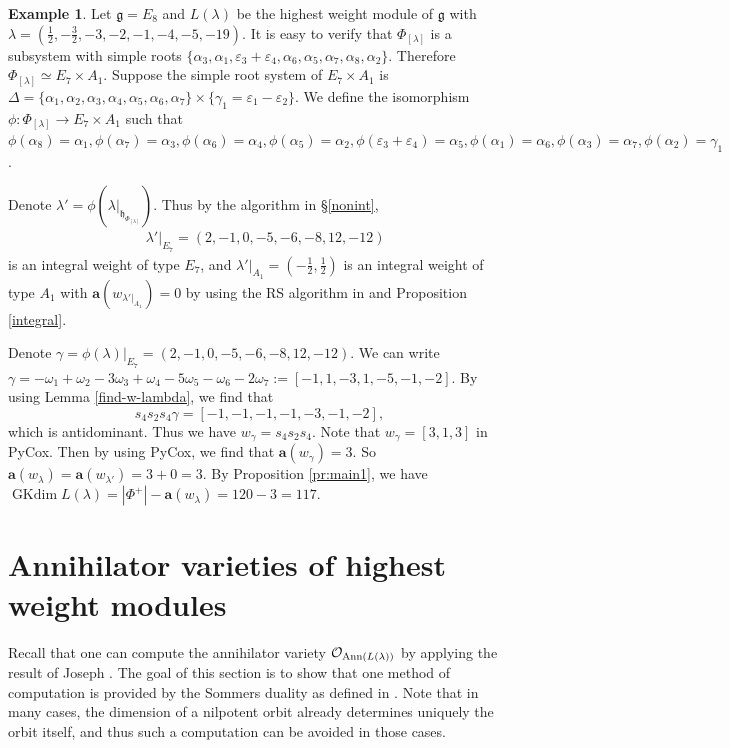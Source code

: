 \documentclass[reqno,12pt]{amsart}
\numberwithin{equation}{section}
\theoremstyle{plain}
\theoremstyle{definition}
\newtheorem{ex}[Thm]{Example}
\newcommand{\lam}{\lambda}
\newcommand{\ep}{\varepsilon}
\newcommand{\aff}{ \mathbf{a} }
\newcommand{\gkd}{\operatorname{GKdim}}
\begin{document}
\begin{ex}
	Let $\mathfrak{g}=E_8$ and $L(\lam)$ be the highest weight module of $\mathfrak{g}$ with  $\lambda=(\frac{1}{2},-\frac{3}{2},-3,-2,-1,-4,-5,-19)$. It is easy to verify that $\Phi_{[\lambda]}$ is a subsystem with simple roots $\{\alpha_3,\alpha_1,\ep_3+\ep_4,\alpha_6,\alpha_5,\alpha_7,\alpha_8,\alpha_2\}$. Therefore $\Phi_{[\lambda]}\simeq E_7\times A_1$. Suppose the simple root system of $E_7\times A_1$ is $\Delta=\{\alpha_1, \alpha_2, \alpha_3,\alpha_4,\alpha_5,\alpha_6,\alpha_7\}\times \{\gamma_1=\ep_1-\ep_2\}$.
  We define the  isomorphism $\phi:  \Phi_{[\lambda]} \rightarrow E_7\times A_1$ such that  $\phi(\alpha_8)=\alpha_1, \phi(\alpha_7)=\alpha_3, \phi(\alpha_6)=\alpha_4, \phi(\alpha_5)=\alpha_2,\phi(\ep_3+\ep_4)=\alpha_5,\phi(\alpha_1)=\alpha_6,\phi(\alpha_3)=\alpha_7, \phi(\alpha_2)=\gamma_1$.

  Denote ${\lam}'=\phi(\lam|_{\mathfrak{h}_{\Phi_{[\lambda]}}})$. 
 Thus  by the algorithm in \S \ref{nonint},
 \begin{align*}
           &\lam'|_{{E_7}}=(2,-1,0,-5,-6,-8,12,-12)
        \end{align*} is an integral weight of type $E_7$, and 
$\lam'|_{A_1}=(-\frac{1}{2},\frac{1}{2})$ is an integral weight of type $A_1$ with $\aff(w_{\lam'|_{{A_1}}})=0$ by using  the RS algorithm in \cite{BXX} and Proposition \ref{integral}.


Denote $\gamma=\phi({\lam})|_{E_7}=(2,-1,0,-5,-6,-8,12,-12)$.
We can write $\gamma=-\omega_1+\omega_2-3\omega_3+\omega_4-5\omega_5-\omega_6-2\omega_7:=[-1,1,-3,1,-5,-1,-2]$. By using Lemma \ref{find-w-lambda}, we find that  $$s_4s_2s_4\gamma=[-1,-1,-1,-1,-3,-1,-2],$$ which is  antidominant. Thus we have $w_{\gamma}=s_4s_2s_4$.
Note that $w_{\gamma}=[3,1,3]$ in PyCox. Then by using PyCox, we find that  $\aff(w_{\gamma})=3$.
So $\aff(w_{\lambda})=\aff(w_{\lambda'})=3+0=3$.
 By Proposition \ref{pr:main1},  we have $\gkd L(\lambda)=|\Phi^+|-\aff(w_{\lambda})=120-3=117$.
\end{ex}


\section{Annihilator varieties of highest weight modules}\label{AVHWM}

Recall that one can compute the annihilator variety $\mathcal{O}_{{\rm Ann}(L(\lambda))}$ by applying the result of Joseph \cite{Jo85}. The goal of this section is to show that one method of computation is provided by the Sommers duality as defined in \cite{Sommers}. Note that in many cases, the dimension of a nilpotent orbit already determines uniquely the orbit itself, and thus such a computation can be avoided in those cases.
\end{document}
